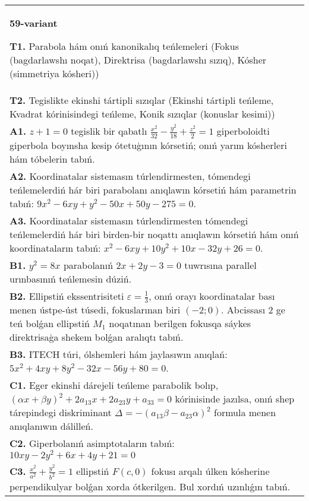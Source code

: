 \documentclass{article}
\begin{document}
\begin{tabular}{m{17cm}}
\textbf{59-variant}
\newline

\textbf{T1.} Parabola hám onıń kanonikalıq teńlemeleri (Fokus (bagdarlawshı noqat), Direktrisa (bagdarlawshı sızıq), Kósher (simmetriya kósheri)) \\
\textbf{T2.} Tegislikte ekinshi tártipli sızıqlar (Ekinshi tártipli teńleme, Kvadrat kórinisindegi teńleme, Konik sızıqlar (konuslar kesimi)) \\
\textbf{A1.} $z+1=0$ tegislik bir qabatlı $\frac{x^2}{32}-\frac{y^2}{18}+\frac{z^2}{2}=1$ giperboloidti giperbola boyınsha kesip ótetuģının kórsetiń; onıń yarım kósherleri hám tóbelerin tabıń. \\
\textbf{A2.} Koordinatalar sistemasın túrlendirmesten, tómendegi teńlemelerdiń hár biri parabolanı anıqlawın kórsetiń hám parametrin tabıń: $9 x^2-6 x y+y^2-50 x+50 y-275=0$. \\
\textbf{A3.} Koordinatalar sistemasın túrlendirmesten tómendegi teńlemelerdiń hár biri birden-bir noqattı anıqlawın kórsetiń hám onıń koordinataların tabıń: $x^2-6 x y+10 y^2+10 x-32 y+26=0$. \\
\textbf{B1.} $y^2=8x$ parabolanıń $2x+2y-3=0$ tuwrısına parallel urınbasınıń teńlemesin dúziń. \\
\textbf{B2.} Ellipstiń ekssentrisiteti $\varepsilon=\frac{1}{3}$, onıń orayı koordinatalar bası menen ústpe-úst túsedi, fokuslarınan biri $ (-2; 0) $. Abcissası 2 ge teń bolǵan ellipstiń $M_1$ noqatınan berilgen fokusqa sáykes direktrisaģa shekem bolǵan aralıqtı tabıń. \\
\textbf{B3.} ITECH túri, ólshemleri hám jaylasıwın anıqlań: $5 x^2+4 x y+8 y^2-32 x-56 y+80=0$. \\
\textbf{C1.} Eger ekinshi dárejeli teńleme parabolik bolıp, $ (\alpha x+\beta y) ^2+2a_{13}x+2a_{23}y+a_{33}=0$ kórinisinde jazılsa, onıń shep tárepindegi diskriminant $\Delta=- (a_{13} \beta-a_{23} \alpha) ^2$ formula menen anıqlanıwın dálilleń. \\
\textbf{C2.} Giperbolanıń asimptotaların tabıń: $10 x y-2 y^2+6 x+4 y+21=0$ \\
\textbf{C3.} $\frac{x^2}{a^2}+\frac{y^2}{b^2}=1$ ellipstiń $F(c, 0)$ fokusı arqalı úlken kósherine perpendikulyar bolǵan xorda ótkerilgen. Bul xordıń uzınlıǵın tabıń. \\

\end{tabular}
\vspace{1cm}
\end{document}

